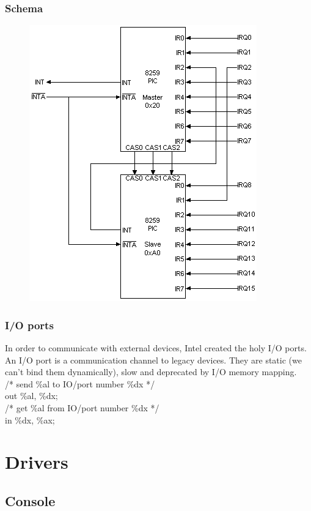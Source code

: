 \documentclass{beamer}
\begin{document}
\begin{frame}
  \frametitle{Schema}

  \begin{figure}
  \includegraphics[scale=0.42]{pic.png}
  \end{figure}
\end{frame}

\begin{frame}
  \frametitle{I/O ports}

  In order to communicate with external devices, Intel created the holy I/O ports.\\
  An I/O port is a communication channel to legacy devices. They are static (we can't bind them dynamically), slow and deprecated by I/O memory mapping.\\
  \vspace{20pt}
  /* send \%al to IO/port number \%dx */\\
  out \%al, \%dx;\\
  /* get \%al from IO/port number \%dx */\\
  in \%dx, \%ax;
\end{frame}

\section{Drivers}

\subsection{Console}
\end{document}
